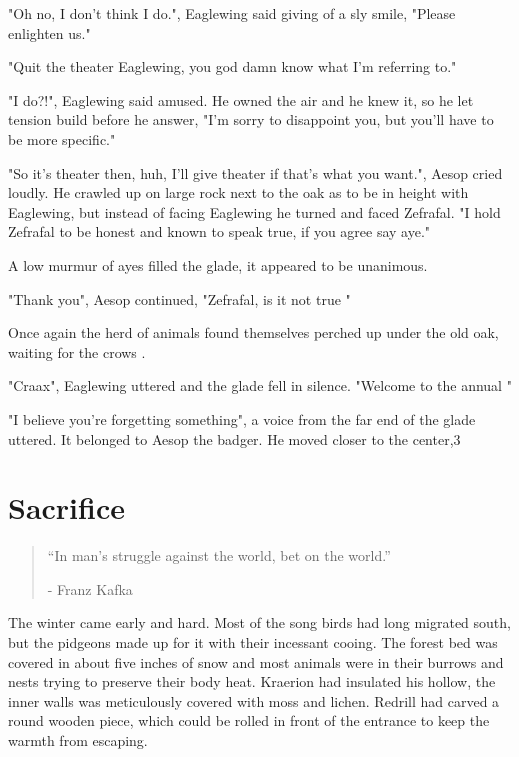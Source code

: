 \documentclass[smalldemyvopaper,11pt,twoside,onecolumn,openright,extrafontsizes]{memoir}
\begin{document}
"Oh no, I don't think I do.", Eaglewing said giving of a sly smile, "Please enlighten us."

"Quit the theater Eaglewing, you god damn know what I'm referring to."

"I do?!", Eaglewing said amused. He owned the air and he knew it, so he let tension build before he answer, "I'm sorry to disappoint you, but you'll have to be more specific."

"So it's theater then, huh, I'll give theater if that's what you want.", Aesop cried loudly. He crawled up on large rock next to the oak as to be in height with Eaglewing, but instead of facing Eaglewing he turned and faced Zefrafal. "I hold Zefrafal to be honest and known to speak true, if you agree say aye."

A low murmur of ayes filled the glade, it appeared to be unanimous. 

"Thank you", Aesop continued, "Zefrafal, is it not true "

 
 
Once again the herd of animals found themselves perched up under the old oak, waiting for the crows . 

"Craax", Eaglewing uttered and the glade fell in silence. "Welcome to the annual "


"I believe you're forgetting something", a voice from the far end of the glade uttered. It belonged to Aesop the badger. He moved closer to the center,3  

\chapter{Sacrifice}

\vspace{-1.3cm}
\begin{localsize}{10}
	\begin{quote}
		“In man's struggle against the world, bet on the world.”
		\begin{flushright}- Franz Kafka \end{flushright}
	\end{quote} 
\end{localsize}
\vspace{1cm}

The winter came early and hard. Most of the song birds had long migrated south, but the pidgeons made up for it with their incessant cooing. The forest bed was covered in about five inches of snow and most animals were in their burrows and nests trying to preserve their body heat. Kraerion had insulated his hollow, the inner walls was meticulously covered with moss and lichen. Redrill had carved a round wooden piece, which could be rolled in front of the entrance to keep the warmth from escaping.  
\end{document}
